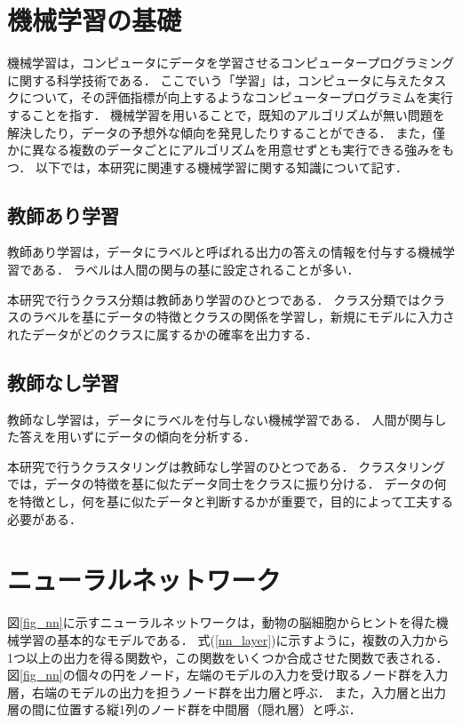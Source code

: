 \documentclass[12pt,a4j]{jreport}
\begin{document}

\section{機械学習の基礎}
機械学習は，コンピュータにデータを学習させるコンピュータープログラミングに関する科学技術である\cite{aurellen20}．
ここでいう「学習」は，コンピュータに与えたタスクについて，その評価指標が向上するようなコンピュータープログラミムを実行することを指す．
機械学習を用いることで，既知のアルゴリズムが無い問題を解決したり，データの予想外な傾向を発見したりすることができる．
また，僅かに異なる複数のデータごとにアルゴリズムを用意せずとも実行できる強みをもつ．
以下では，本研究に関連する機械学習に関する知識について記す．


\subsection{教師あり学習}
教師あり学習は，データにラベルと呼ばれる出力の答えの情報を付与する機械学習である\cite{aurellen20}．
ラベルは人間の関与の基に設定されることが多い．

本研究で行うクラス分類は教師あり学習のひとつである．
クラス分類ではクラスのラベルを基にデータの特徴とクラスの関係を学習し，新規にモデルに入力されたデータがどのクラスに属するかの確率を出力する．

\subsection{教師なし学習}
教師なし学習は，データにラベルを付与しない機械学習である\cite{aurellen20}．
人間が関与した答えを用いずにデータの傾向を分析する．

本研究で行うクラスタリングは教師なし学習のひとつである．
クラスタリングでは，データの特徴を基に似たデータ同士をクラスに振り分ける．
データの何を特徴とし，何を基に似たデータと判断するかが重要で，目的によって工夫する必要がある．


\section{ニューラルネットワーク}
図\ref{fig_nn}に示すニューラルネットワークは，動物の脳細胞からヒントを得た機械学習の基本的なモデルである\cite{aurellen20}．
式(\ref{nn_layer})に示すように，複数の入力から1つ以上の出力を得る関数や，この関数をいくつか合成させた関数で表される．
図\ref{fig_nn}の個々の円をノード，左端のモデルの入力を受け取るノード群を入力層，右端のモデルの出力を担うノード群を出力層と呼ぶ．
また，入力層と出力層の間に位置する縦1列のノード群を中間層（隠れ層）と呼ぶ．
\end{document}
